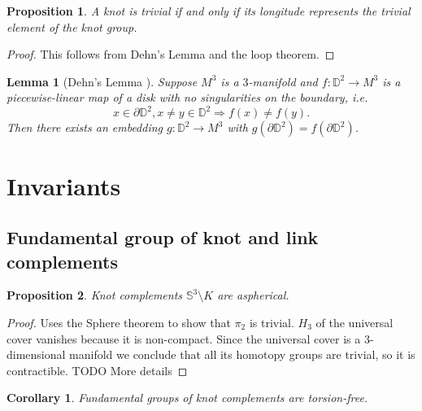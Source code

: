 \documentclass[nobib]{tufte-book} %
\newtheorem{proposition}{Proposition}
\newtheorem{lemma}{Lemma}
\newtheorem{corollary}{Corollary}
\theoremstyle{definition}
\theoremstyle{remark}
\newcommand{\sphere}[1]{\mathbb{S}^{#1}}
\newcommand{\disk}[1]{\mathbb{D}^{#1}}
\begin{document}
\begin{proposition}
	A knot is trivial if and only if its longitude
	represents the trivial element of the knot group. 
\end{proposition}
\begin{proof}
	This follows from Dehn's Lemma and the loop theorem.
\end{proof}

\begin{lemma}[{Dehn's Lemma \citep[4.A.1]{rolfsen2003knots}}] 
	Suppose $M^{3}$ is a $3$-manifold and $f \colon \disk{2} \rightarrow M^{3}$
	is a piecewise-linear map of a disk with no singularities on the boundary, i.e.
	\[
		x \in \partial \disk{2}, x \ne y \in \disk{2} \Rightarrow f(x) \ne f(y).
	\]
	Then there exists an embedding $g \colon \disk{2} \rightarrow M^{3}$
	with $g(\partial \disk{2}) = f(\partial \disk{2})$.
\end{lemma}

\section{Invariants}

\subsection{Fundamental group of knot and link complements}

\begin{proposition}
	Knot complements $\sphere{3} \setminus K$
	are aspherical.
\end{proposition}
\begin{proof}
	Uses the Sphere theorem to show that $\pi_{2}$ is trivial.
	$H_{3}$ of the universal cover vanishes because it is non-compact.
	Since the universal cover is a $3$-dimensional manifold we conclude that
	all its homotopy groups are trivial, so it is contractible.
	TODO More details
\end{proof}

\begin{corollary}
	Fundamental groups of knot complements are torsion-free.
\end{corollary}
\end{document}
